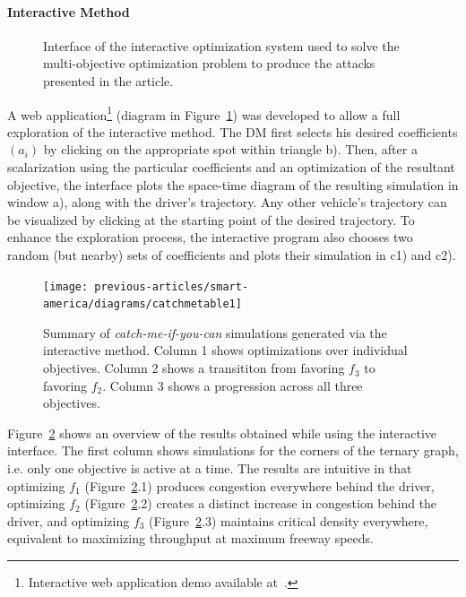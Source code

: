 \paragraph{Interactive Method}


\begin{figure}[t]
\centering
{}%
%

\caption{Interface of the interactive optimization system used to solve the multi-objective optimization problem to produce the attacks presented in the article.}

\label{fig:webinterface}
\end{figure}

 A web application\footnote{Interactive web application demo available at~\cite{smartroadswebsite}.} (diagram in Figure~\ref{fig:webinterface}) was developed to allow a full exploration of the interactive method. The DM first selects his desired coefficients $(a_i)$ by clicking on the appropriate spot within triangle b). Then, after a scalarization using the particular coefficients and an optimization of the resultant objective, the interface plots the space-time diagram of the resulting simulation in window a), along with the driver's trajectory. Any other vehicle's trajectory can be visualized by clicking at the starting point of the desired trajectory. To enhance the exploration process, the interactive program also chooses two random (but nearby) sets of coefficients and plots their simulation in c1) and c2).


\begin{figure}[t]
	\centering
	  \texttt{[image: previous-articles/smart-america/diagrams/catchmetable1]}
	\caption{Summary of \emph{catch-me-if-you-can} simulations generated via the interactive method. Column 1 shows optimizations over individual objectives. Column 2 shows a transititon from favoring $f_3$ to favoring $f_2$. Column 3 shows a progression across all three objectives.}
	\label{fig:catchme_table_1}
\end{figure}
Figure~\ref{fig:catchme_table_1} shows an overview of the results obtained while using the interactive interface. The first column shows simulations for the corners of the ternary graph, i.e. only one objective is active at a time. The results are intuitive in that optimizing $f_1$ (Figure~\ref{fig:catchme_table_1}.1) produces congestion everywhere behind the driver, optimizing $f_2$ (Figure~\ref{fig:catchme_table_1}.2) creates a distinct increase in congestion behind the driver, and optimizing $f_3$ (Figure~\ref{fig:catchme_table_1}.3) maintains critical density everywhere, equivalent to maximizing throughput at maximum freeway speeds.

